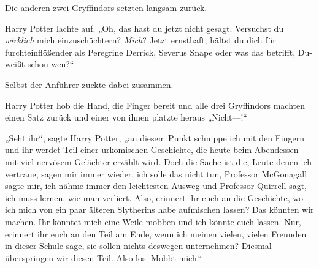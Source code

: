 Die anderen zwei Gryffindors setzten langsam zurück.

Harry Potter lachte auf. „Oh, das hast du jetzt nicht gesagt. Versuchst du \emph{wirklich} mich einzuschüchtern? \emph{Mich}? Jetzt ernsthaft, hältst du dich für furchteinflößender als Peregrine Derrick, Severus Snape oder was das betrifft, Du-weißt-schon-wen?“

Selbst der Anführer zuckte dabei zusammen.

Harry Potter hob die Hand, die Finger bereit und alle drei Gryffindors machten einen Satz zurück und einer von ihnen platzte heraus „Nicht—!“

„Seht ihr“, sagte Harry Potter, „an diesem Punkt schnippe ich mit den Fingern und ihr werdet Teil einer urkomischen Geschichte, die heute beim Abendessen mit viel nervösem Gelächter erzählt wird. Doch die Sache ist die, Leute denen ich vertraue, sagen mir immer wieder, ich solle das nicht tun, Professor McGonagall sagte mir, ich nähme immer den leichtesten Ausweg und Professor Quirrell sagt, ich muss lernen, wie man verliert. Also, erinnert ihr euch an die Geschichte, wo ich mich von ein paar älteren Slytherins habe aufmischen lassen? Das könnten wir machen. Ihr könntet mich eine Weile mobben und ich könnte euch lassen. Nur, erinnert ihr euch an den Teil am Ende, wenn ich meinen vielen, vielen Freunden in dieser Schule sage, sie sollen nichts deswegen unternehmen? Diesmal überspringen wir diesen Teil. Also los. Mobbt mich.“

